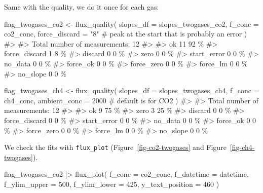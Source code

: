 \documentclass[
  letterpaper,
  DIV=11,
  numbers=noendperiod]{scrartcl}
\newenvironment{Shaded}{\begin{snugshade}}{\end{snugshade}}
\newcommand{\AttributeTok}[1]{\textcolor[rgb]{0.40,0.45,0.13}{#1}}
\newcommand{\CommentTok}[1]{\textcolor[rgb]{0.37,0.37,0.37}{#1}}
\newcommand{\DecValTok}[1]{\textcolor[rgb]{0.68,0.00,0.00}{#1}}
\newcommand{\FunctionTok}[1]{\textcolor[rgb]{0.28,0.35,0.67}{#1}}
\newcommand{\NormalTok}[1]{\textcolor[rgb]{0.00,0.23,0.31}{#1}}
\newcommand{\OtherTok}[1]{\textcolor[rgb]{0.00,0.23,0.31}{#1}}
\newcommand{\SpecialCharTok}[1]{\textcolor[rgb]{0.37,0.37,0.37}{#1}}
\newcommand{\StringTok}[1]{\textcolor[rgb]{0.13,0.47,0.30}{#1}}
\begin{document}
Same with the quality, we do it once for each gas:

\begin{Shaded}
\begin{Highlighting}[]
\NormalTok{flag\_twogases\_co2 }\OtherTok{\textless{}{-}} \FunctionTok{flux\_quality}\NormalTok{(}
  \AttributeTok{slopes\_df =}\NormalTok{ slopes\_twogases\_co2,}
  \AttributeTok{f\_conc =}\NormalTok{ co2\_conc,}
  \AttributeTok{force\_discard =} \StringTok{"8"} \CommentTok{\# peak at the start that is probably an error}
\NormalTok{)}
\CommentTok{\#\textgreater{} }
\CommentTok{\#\textgreater{}  Total number of measurements: 12}
\CommentTok{\#\textgreater{} }
\CommentTok{\#\textgreater{}  ok   11      92 \%}
\CommentTok{\#\textgreater{}  force\_discard    1   8 \%}
\CommentTok{\#\textgreater{}  discard      0   0 \%}
\CommentTok{\#\textgreater{}  zero     0   0 \%}
\CommentTok{\#\textgreater{}  start\_error      0   0 \%}
\CommentTok{\#\textgreater{}  no\_data      0   0 \%}
\CommentTok{\#\textgreater{}  force\_ok     0   0 \%}
\CommentTok{\#\textgreater{}  force\_zero   0   0 \%}
\CommentTok{\#\textgreater{}  force\_lm     0   0 \%}
\CommentTok{\#\textgreater{}  no\_slope     0   0 \%}

\NormalTok{flag\_twogases\_ch4 }\OtherTok{\textless{}{-}} \FunctionTok{flux\_quality}\NormalTok{(}
  \AttributeTok{slopes\_df =}\NormalTok{ slopes\_twogases\_ch4,}
  \AttributeTok{f\_conc =}\NormalTok{ ch4\_conc,}
  \AttributeTok{ambient\_conc =} \DecValTok{2000} \CommentTok{\# default is for CO2}
\NormalTok{)}
\CommentTok{\#\textgreater{} }
\CommentTok{\#\textgreater{}  Total number of measurements: 12}
\CommentTok{\#\textgreater{} }
\CommentTok{\#\textgreater{}  ok   9   75 \%}
\CommentTok{\#\textgreater{}  zero     3   25 \%}
\CommentTok{\#\textgreater{}  discard      0   0 \%}
\CommentTok{\#\textgreater{}  force\_discard    0   0 \%}
\CommentTok{\#\textgreater{}  start\_error      0   0 \%}
\CommentTok{\#\textgreater{}  no\_data      0   0 \%}
\CommentTok{\#\textgreater{}  force\_ok     0   0 \%}
\CommentTok{\#\textgreater{}  force\_zero   0   0 \%}
\CommentTok{\#\textgreater{}  force\_lm     0   0 \%}
\CommentTok{\#\textgreater{}  no\_slope     0   0 \%}
\end{Highlighting}
\end{Shaded}

We check the fits with \texttt{flux\_plot}
(Figure~\ref{fig-co2-twogases} and Figure~\ref{fig-ch4-twogases}).

\begin{Shaded}
\begin{Highlighting}[]
\NormalTok{flag\_twogases\_co2 }\SpecialCharTok{|\textgreater{}}
  \FunctionTok{flux\_plot}\NormalTok{(}
    \AttributeTok{f\_conc =}\NormalTok{ co2\_conc,}
    \AttributeTok{f\_datetime =}\NormalTok{ datetime,}
    \AttributeTok{f\_ylim\_upper =} \DecValTok{500}\NormalTok{,}
    \AttributeTok{f\_ylim\_lower =} \DecValTok{425}\NormalTok{,}
    \AttributeTok{y\_text\_position =} \DecValTok{460}
\NormalTok{  )}
\end{Highlighting}
\end{Shaded}
\end{document}
